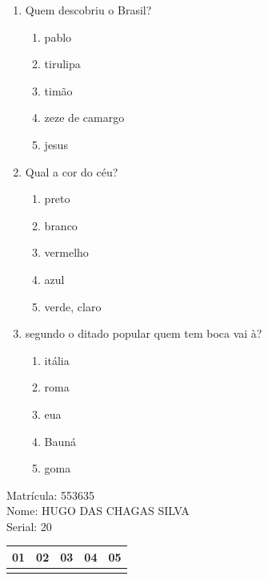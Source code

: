 \documentclass[10pt,a4paper,twocolumn]{report}
\begin{document}
 \begin{enumerate} 
    \item  Quem descobriu o Brasil?





    \begin{enumerate}
    \item  pablo

\item  tirulipa

\item  timão

\item  zeze de camargo

\item  jesus


    \end{enumerate} 
    \item  Qual a cor do céu?





    \begin{enumerate}
    \item  preto

\item  branco

\item  vermelho

\item  azul

\item  verde, claro


    \end{enumerate} 
    \item  segundo o ditado popular quem tem boca vai à?





    \begin{enumerate}
    \item  itália

\item  roma

\item  eua

\item  Bauná

\item  goma


    \end{enumerate}\end{enumerate} 
Matrícula: 553635\\ Nome: HUGO DAS CHAGAS SILVA \\ Serial: 20\\
\begin{tabular}{|l|l|l|l|l|}\hline
01  &02  &03  &04  &05 \\ \hline 
 & & & & \\ \hline 
\end{tabular}
 \cleardoublepage 
\end{document}
